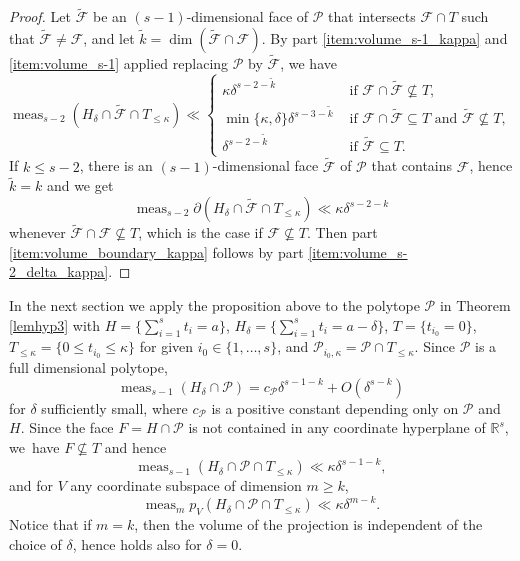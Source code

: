 \documentclass[JEP,XML,SOM,Unicode,published]{cedram}
\let\del\delta
\newcommand{\calP}{\mathcal{P}}
\newcommand\RR{\mathbb{R}}
\DeclareMathOperator{\meas}{meas}
\theoremstyle{definition}
\numberwithin{theorem}{section}
\begin{document}
\begin{proof}
Let $\widetilde{\mathcal F}$ be an $(s-1)$-dimensional face of $\mathcal P$ that intersects $\mathcal F\cap T$
such that $\widetilde{\mathcal F}\neq\mathcal F$, and let
$\tilde k=\dim(\widetilde{\mathcal F}\cap\mathcal F)$. By part \eqref{item:volume_s-1_kappa} and \eqref{item:volume_s-1} applied replacing
$\mathcal P$ by $\widetilde{\mathcal F}$, we have
\[
\meas_{s-2}(H_\delta\cap\widetilde{\mathcal F}\cap T_{\leq\kappa})
\ll \begin{cases}
\kappa\delta^{s-2-\tilde k} & \text{ if }\mathcal F\cap\widetilde{\mathcal F}\nsubseteq T,\\
\min\{\kappa,\delta\}\delta^{s-3-\tilde k} &\text{ if } \mathcal F\cap\widetilde{\mathcal F}\subseteq T \text{ and } \widetilde{\mathcal F}\nsubseteq T,\\
\delta^{s-2-\widetilde k} & \text{ if } \widetilde{\mathcal F}\subseteq T.
\end{cases}
\]
If $k\leq s-2$, there is an $(s-1)$-dimensional face $\widetilde{\mathcal F}$ of $\mathcal P$ that contains $\mathcal F$, hence $\tilde k=k$ and we get
\[
\meas_{s-2} \partial (H_{\del}\cap \widetilde{\mathcal F}\cap T_{\leq\kappa}) \ll \kappa \del^{s-2-k}
\]
whenever $\widetilde{\mathcal F}\cap\mathcal F\nsubseteq T$, which is the case if $\mathcal F\nsubseteq T$.
Then part \eqref{item:volume_boundary_kappa} follows by part \eqref{item:volume_s-2_delta_kappa}.
\end{proof}

In the next section we apply the proposition above to the polytope $\mathcal P$ in Theorem \ref{lemhyp3} with $H=\{\sum_{i=1}^s t_i=a\}$, $H_\delta=\{\sum_{i=1}^s t_i=a-\delta\}$, $T=\{t_{i_0}=0\}$, $T_{\leq\kappa}=\{0\leq t_{i_0}\leq\kappa\}$ for given $i_0\in\{1,\dots,s\}$, and $\mathcal P_{i_0,\kappa}=\mathcal P\cap T_{\leq\kappa}$. Since $\mathcal P$ is a full dimensional polytope,
\[
\meas_{s-1} (H_\delta \cap \mathcal P)=
c_\calP \delta^{s-1-k}+O(\delta^{s-k})
\]
for $\delta$ sufficiently small, where $c_\calP$ is a positive constant depending only on $\mathcal P$ and $H$.
Since the face $F=H\cap\mathcal P$ is not contained in any coordinate hyperplane of $\RR^s$, we~have $F\nsubseteq T$ and hence\vspace*{-3pt}
\[
\meas_{s-1} (H_\delta \cap \mathcal P \cap T_{\leq \kappa}) \ll
\kappa \delta^{s-1-k},
\]
and for $V$ any coordinate subspace of dimension $m\geq k$,\vspace*{-3pt}
\[
\meas_mp_V(H_\delta\cap\mathcal P\cap T_{\leq \kappa})\ll
\kappa \delta^{m-k}.
\]
Notice that if $m=k$, then the volume of the projection is independent of the choice of $\delta$, hence holds also for $\delta=0$.
\end{document}
